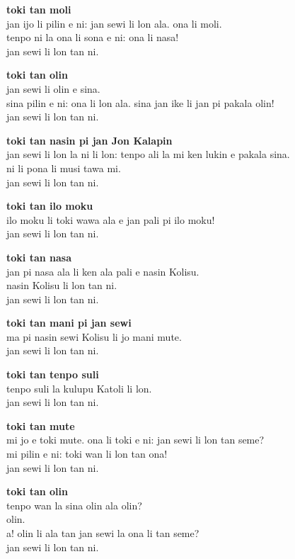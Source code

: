 \textbf{toki tan moli}   \\
jan ijo li pilin e ni: jan sewi li lon ala. ona li moli.   \\
tenpo ni la ona li sona e ni: ona li nasa!   \\
jan sewi li lon tan ni.

\textbf{toki tan olin}   \\
jan sewi li olin e sina.   \\
sina pilin e ni: ona li lon ala. sina jan ike li jan pi pakala olin!   \\
jan sewi li lon tan ni.

\textbf{toki tan nasin pi jan Jon Kalapin}    \\
jan sewi li lon la ni li lon: tenpo ali la mi ken lukin e pakala sina.   \\
ni li pona li musi tawa mi.   \\
jan sewi li lon tan ni.

\textbf{toki tan ilo moku}   \\
ilo moku li toki wawa ala e jan pali pi ilo moku!   \\
jan sewi li lon tan ni.

\textbf{toki tan nasa}   \\
jan pi nasa ala li ken ala pali e nasin Kolisu.   \\
nasin Kolisu li lon tan ni.   \\
jan sewi li lon tan ni.

\textbf{toki tan mani pi jan sewi}   \\
ma pi nasin sewi Kolisu li jo mani mute.   \\
jan sewi li lon tan ni.

\textbf{toki tan tenpo suli}   \\
tenpo suli la kulupu Katoli li lon.   \\
jan sewi li lon tan ni.

\textbf{toki tan mute}   \\
mi jo e toki mute. ona li toki e ni: jan sewi li lon tan seme?   \\
mi pilin e ni: toki wan li lon tan ona!   \\
jan sewi li lon tan ni.

\textbf{toki tan olin}   \\
tenpo wan la sina olin ala olin?   \\
olin.   \\
a! olin li ala tan jan sewi la ona li tan seme?   \\
jan sewi li lon tan ni.

